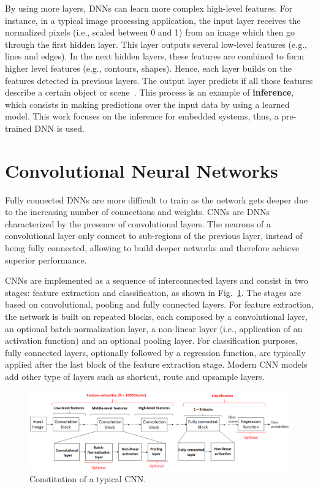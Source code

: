 By using more layers, DNNs can learn more complex high-level features. For instance, in a typical image processing application, the input layer receives the normalized pixels (i.e., scaled between 0 and 1) from an image which then go through the first hidden layer. This layer outputs several low-level features (e.g., lines and edges). In the next hidden layers, these features are combined to form higher level features (e.g., contours, shapes). Hence, each layer builds on the features detected in previous layers. The output layer predicts if all those features describe a certain object or scene~\cite{sze:dnn_survey}. This process is an example of \textbf{inference}, which consists in making predictions over the input data by using a learned model. This work focuses on the inference for embedded systems, thus, a pre-trained DNN is used.

\section{Convolutional Neural Networks}
\label{section:CNN}

Fully connected DNNs are more difficult to train as the network gets deeper due to the increasing number of connections and weights. CNNs are DNNs characterized by the presence of convolutional layers. The neurons of a convolutional layer only connect to sub-regions of the previous layer, instead of being fully connected, allowing to build deeper networks and therefore achieve superior performance. 

CNNs are implemented as a sequence of interconnected layers and consist in two stages: feature extraction and classification, as shown in Fig.~\ref{fig:CNN}. The stages are based on convolutional, pooling and fully connected layers. For feature extraction, the network is built on repeated blocks, each composed by a convolutional layer, an optional batch-normalization layer, a non-linear layer (i.e., application of an activation function) and an optional pooling layer. For classification purposes, fully connected layers, optionally followed by a regression function, are typically applied after the last block of the feature extraction stage. Modern CNN models add other type of layers such as shortcut, route and upsample layers. 

\begin{figure}[!htb]
  \centering
  \includegraphics[width=\textwidth]{Figures/CNN.png}
  \caption{Constitution of a typical CNN.}
  \label{fig:CNN}
\end{figure}
\vspace{-6.5mm}


